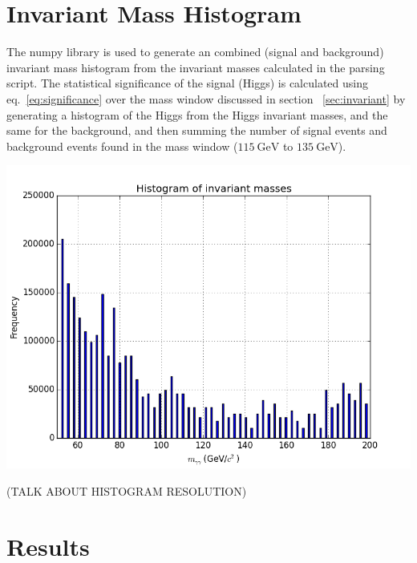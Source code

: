 \documentclass[11pt]{amsart}
\newenvironment{Figure}
  {\par\medskip\noindent\minipage{\linewidth}}
  {\endminipage\par\medskip}
\begin{document}
\begin{multicols}{2}
\section{Invariant Mass Histogram}

The numpy library is used to generate an combined (signal and background) invariant mass histogram from the invariant masses calculated in the parsing script. The statistical significance of the signal (Higgs) is calculated using eq.~\ref{eq:significance} over the mass window discussed in section ~\ref{sec:invariant} by generating a histogram of the Higgs from the Higgs invariant masses, and the same for the background, and then summing the number of signal events and background events found in the mass window ($\SI{115}{\giga\electronvolt}$ to $\SI{135}{\giga\electronvolt}$).

\begin{Figure}
  \centering
  \includegraphics[width=\linewidth]{invmass2}
  \label{fig:invmass}
\end{Figure}

(TALK ABOUT HISTOGRAM RESOLUTION)

\section{Results}


\end{multicols}
\end{document}
